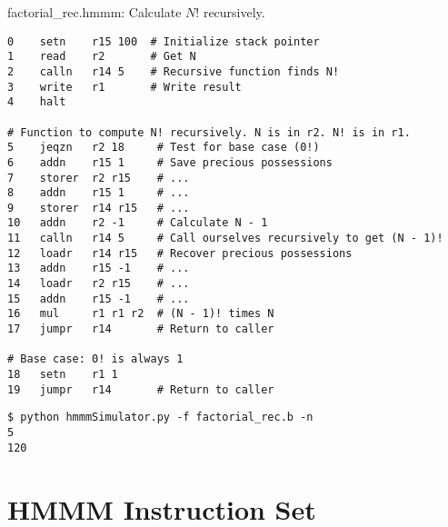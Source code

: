 \documentclass[8pt,a4paper,compress,handout]{beamer}
\begin{document}
\begin{frame}[fragile]
\begin{framed}
\tiny factorial\_rec.hmmm: Calculate $N!$ recursively.
\end{framed}

\begin{lstlisting}[language={}]
0    setn    r15 100  # Initialize stack pointer
1    read    r2       # Get N
2    calln   r14 5    # Recursive function finds N!
3    write   r1       # Write result
4    halt

# Function to compute N! recursively. N is in r2. N! is in r1. 
5    jeqzn   r2 18     # Test for base case (0!)
6    addn    r15 1     # Save precious possessions
7    storer  r2 r15    # ...
8    addn    r15 1     # ...
9    storer  r14 r15   # ...
10   addn    r2 -1     # Calculate N - 1
11   calln   r14 5     # Call ourselves recursively to get (N - 1)!
12   loadr   r14 r15   # Recover precious possessions
13   addn    r15 -1    # ...
14   loadr   r2 r15    # ...
15   addn    r15 -1    # ...
16   mul     r1 r1 r2  # (N - 1)! times N
17   jumpr   r14       # Return to caller

# Base case: 0! is always 1
18   setn    r1 1
19   jumpr   r14       # Return to caller
\end{lstlisting}

\begin{lstlisting}[language={}]
$ python hmmmSimulator.py -f factorial_rec.b -n
5
120
\end{lstlisting}
\end{frame}

\section{HMMM Instruction Set}
\end{document}
